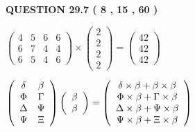 \documentclass[12pt]{article}
\begin{document}
\vspace{0.2in}
  
{\textbf{\Large{QUESTION
29.7 
 (           8 ,          15 ,          60 )
}}}
  
  
 
 
\noindent{}

 
$\left( \begin{array}{ccccccccccccccc}
           4  & 
           5  & 
           6  & 
           6  \\ 
           6  & 
           7  & 
           4  & 
           4  \\ 
           6  & 
           5  & 
           4  & 
           6
\end{array}\right) \times
\left( \begin{array}{c}
           2  \\ 
           2  \\ 
           2  \\ 
           2
\end{array}\right)  =
\left( \begin{array}{c}
          42  \\ 
          42  \\ 
          42
\end{array}\right)  $
 
$  %
 \left( \begin{array}
 {
 c
 c
 }
 \delta & 
 \beta \\ 
 \Phi & 
 \Gamma \\ 
 \Delta & 
 \Psi \\ 
 \Psi & 
                    \Xi
 \end{array} \right)
 \left( \begin{array}
 {
 c
 }
 \beta \\ 
 \beta
 \end{array} \right)
=
 \left( \begin{array}
 {
 c
 }
  \delta \times  \beta +  \beta \times  \beta \\ 
  \Phi \times  \beta +  \Gamma \times  \beta \\ 
  \Delta \times  \beta +  \Psi \times  \beta \\ 
  \Psi \times  \beta +                     \Xi \times  \beta
 \end{array} \right)
$
 
 
 
 
 
\noindent{}
\end{document}
